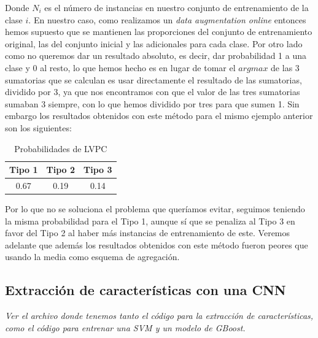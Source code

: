 Donde $N_i$ es el número de instancias en nuestro conjunto de entrenamiento de la clase $i$. En nuestro caso, como realizamos un \textit{data augmentation online} entonces hemos supuesto que se mantienen las proporciones del conjunto de entrenamiento original, las del conjunto inicial y las adicionales para cada clase. Por otro lado como no queremos dar un resultado absoluto, es decir, dar probabilidad 1 a una clase y 0 al resto, lo que hemos hecho es en lugar de tomar el $argmax$ de las 3 sumatorias que se calculan es usar directamente el resultado de las sumatorias, dividido por 3, ya que nos encontramos con que el valor de las tres sumatorias sumaban 3 siempre, con lo que hemos dividido por tres para que sumen 1. Sin embargo los resultados obtenidos con este método para el mismo ejemplo anterior son los siguientes:

\begin{table}[H]
\centering
\caption{Probabilidades de LVPC}
\begin{tabular}{|c|c|c|}
\hline
Tipo 1 & Tipo 2 & Tipo 3 \\ \hline
0.67   & 0.19   & 0.14   \\ \hline
\end{tabular}
\end{table}

Por lo que no se soluciona el problema que queríamos evitar, seguimos teniendo la misma probabilidad para el Tipo 1, aunque sí que se penaliza al Tipo 3 en favor del Tipo 2 al haber más instancias de entrenamiento de este. Veremos adelante que además los resultados obtenidos con este método fueron peores que usando la media como esquema de agregación.

\subsection{Extracción de características con una CNN}

\emph{Ver el archivo  donde tenemos tanto el código para la extracción de características, como el código para entrenar una SVM y un modelo de GBoost.}\\

